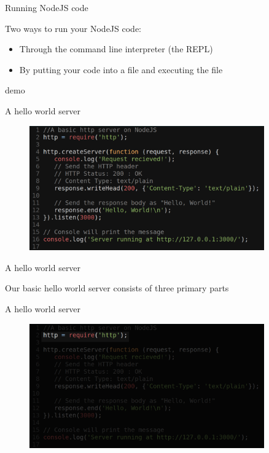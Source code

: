 \documentclass{beamer}
\begin{document}
\begin{frame}{Running NodeJS code}

Two ways to run your NodeJS code:

\begin{itemize}
  \item Through the command line interpreter (the REPL)
  \item By putting your code into a file and executing the file
\end{itemize}

\pause
demo

\end{frame}


\begin{frame}{A hello world server}

\begin{figure}[h]
\includegraphics[width=0.9\textwidth]{helloworld}
\end{figure}

\end{frame}

\begin{frame}{A hello world server}

Our basic hello world server consists of three primary parts

\end{frame}

\begin{frame}{A hello world server}

\begin{figure}[h]
\includegraphics[width=0.9\textwidth]{helloworld2}
\end{figure}

\end{frame}
\end{document}
